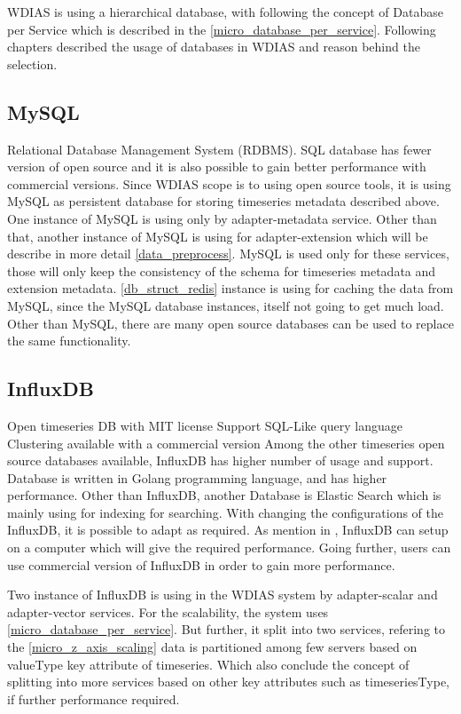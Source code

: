 WDIAS is using a hierarchical database, with following the concept of Database per Service which is described in the \ref{micro_database_per_service}.
Following chapters described the usage of databases in WDIAS and reason behind the selection.

\subsection{MySQL}
Relational Database Management System (RDBMS).
SQL database has fewer version of open source and it is also possible to gain better performance with commercial versions. 
Since WDIAS scope is to using open source tools, it is using MySQL as persistent database for storing timeseries metadata described above.
One instance of MySQL is using only by adapter-metadata service.
Other than that, another instance of MySQL is using for adapter-extension which will be describe in more detail \ref{data_preprocess}.
MySQL is used only for these services, those will only keep the consistency of the schema for timeseries metadata and extension metadata.
\ref{db_struct_redis} instance is using for caching the data from MySQL, since the MySQL database instances, itself not going to get much load.
Other than MySQL, there are many open source databases can be used to replace the same functionality.

\subsection{InfluxDB} \cite{influxdbInfluxDBDocumentation}
Open timeseries DB with MIT license
Support SQL-Like query language
Clustering available with a commercial version
Among the other timeseries open source databases available, InfluxDB has higher number of usage and support. Database is written in Golang programming language,
and has higher performance. Other than InfluxDB, another Database is Elastic Search which is mainly using for indexing for searching.
With changing the configurations of the InfluxDB, it is possible to adapt as required. As mention in \cite{influxdbInfluxDBDocumentation}, 
InfluxDB can setup on a computer which will give the required performance. Going further, users can use commercial version of InfluxDB in order to gain more performance.

Two instance of InfluxDB is using in the WDIAS system by adapter-scalar and adapter-vector services. For the scalability, the system uses \ref{micro_database_per_service}.
But further, it split into two services, refering to the \ref{micro_z_axis_scaling} data is partitioned among few servers based on valueType key attribute of timeseries.
Which also conclude the concept of splitting into more services based on other key attributes such as timeseriesType, if further performance required.

